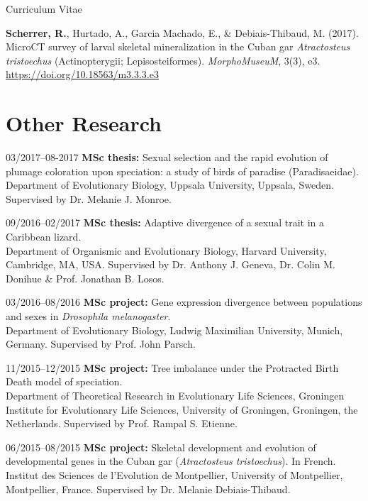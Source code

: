 \documentclass[11pt,a4paper]{article}
\begin{document}
\begin{cv}{Curriculum Vitae}
\begin{cvlist}{}
			\item \textbf{Scherrer, R.}, Hurtado, A., Garcia Machado, E., \& Debiais-Thibaud, M. (2017). MicroCT survey of larval skeletal mineralization in the Cuban gar \textit{Atractosteus tristoechus} (Actinopterygii; Lepisosteiformes). \textit{MorphoMuseuM}, 3(3), e3.\\ \url{https://doi.org/10.18563/m3.3.3.e3}
			
		\end{cvlist}
		
		\section{Other Research}
		
		\begin{cvlist}{}
			
			\item[03/2017--08-2017] 
			\textbf{MSc thesis:} Sexual selection and the rapid evolution of plumage coloration upon speciation: a study of birds of paradise (Paradisaeidae).\\ Department of Evolutionary Biology, Uppsala University, Uppsala, Sweden. Supervised by Dr. Melanie J. Monroe.
			
			\item[09/2016--02/2017] 
			\textbf{MSc thesis:} Adaptive divergence of a sexual trait in a Caribbean lizard.\\
			Department of Organismic and Evolutionary Biology, Harvard University, Cambridge, MA, USA.	Supervised by Dr. Anthony J. Geneva, Dr. Colin M. Donihue \& Prof. Jonathan B. Losos.
			
			\item[03/2016--08/2016] 
			\textbf{MSc project:} Gene expression divergence between populations and sexes in \textit{Drosophila melanogaster}.\\
			Department of Evolutionary Biology, Ludwig Maximilian University, Munich, Germany. Supervised by Prof. John Parsch.
			
			\item[11/2015--12/2015] 
			\textbf{MSc project:} Tree imbalance under the Protracted Birth Death model of speciation.\\ Department of Theoretical Research in Evolutionary Life Sciences, Groningen Institute for Evolutionary Life Sciences, University of Groningen, Groningen, the Netherlands. Supervised by Prof. Rampal S. Etienne.
			
			\item[06/2015--08/2015] 
			\textbf{MSc project:} Skeletal development and evolution of developmental genes in the Cuban gar (\textit{Atractosteus tristoechus}). In French.\\ 
			Institut des Sciences de l'Evolution de Montpellier, University of Montpellier, Montpellier, France. Supervised by Dr. Melanie Debiais-Thibaud.
			

\end{cvlist}
\end{cv}
\end{document}
